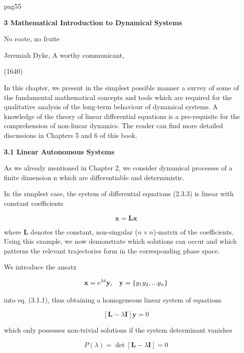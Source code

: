 \documentclass[12pt]{article}
\begin{document}
pag55


\hfill

\textbf{3 Mathematical Introduction to Dynamical
Systems}

\hfill

No roote, no fruite

\hfill

Jeremiah Dyke, A worthy communicant,

\hfill

(1640)

\hfill

In this chapter, we present in the simplest possible manner a survey of some of the
fundamental mathematical concepts and tools which are required for the qualitative
analysis of the long-term behaviour of dynamical systems. A knowledge of the
theory of linear differential equations is a pre-requisite for the comprehension of
non-linear dynamics. The reader can find more detailed discussions in Chapters 5
and 6 of this book.

\hfill

\textbf{3.1 Linear Autonomous Systems}

\hfill

As we already mentioned in Chapter 2, we consider dynamical processes of a finite
dimension n which are differentiable and deterministic.

\hfill

In the simplest case, the system of differential equations (2.3.3) is linear with constant
coefficients

\[
\mathbf{\dot{x} = Lx }
\]

where \textbf{L} denotes the constant, non-singular ($n \times n$)-matrix of the coefficients. Using
this example, we now demonstrate which solutions can occur and which patterns
the relevant trajectories form in the corresponding phase space.

\hfill

We introduce the ansatz

\[
\mathbf{x} = e^{\lambda t} \mathbf{y}, \hspace{3mm} \mathbf{y} = \{y_1 y_2, ... y_n \}
\]

into eq. (3.1.1), thus obtaining a homogeneous linear system of equations

\[
[ \mathbf{L} - \lambda \mathbf{I}] \mathbf{y} = 0
\]

which only possesses non-trivial solutions if the system determinant vanishes

\[
P(\lambda) = \det[\mathbf{L} - \lambda \mathbf{I}] = 0
\]
\end{document}
